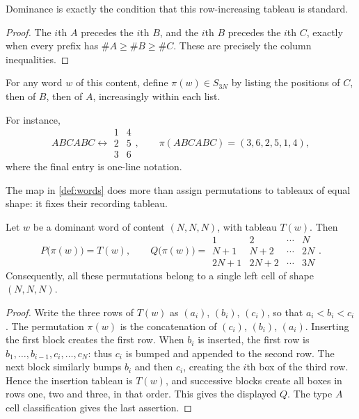 \documentclass[a4paper,11pt]{amsart}
\numberwithin{equation}{subsection}
\theoremstyle{plain}
\theoremstyle{definition}
\theoremstyle{remark}
\begin{document}
\begin{lemma}
Dominance is exactly the condition
that this row-increasing tableau is standard.
\end{lemma}

\begin{proof}
The $i$th $A$ precedes the $i$th $B$, and the $i$th $B$
precedes the $i$th $C$, exactly when every prefix has
$\#A\ge\#B\ge\#C$. These are precisely the column inequalities.
\end{proof}

\begin{definition}\label{def:words}
For any word $w$ of this content, define $\pi(w)\in S_{3N}$ by listing
the positions of $C$, then of $B$, then of $A$, increasingly within
each list. 
\end{definition}

\begin{example}
For instance,
\[
ABCABC\longleftrightarrow
\begin{array}{cc}1&4\\2&5\\3&6\end{array},
\qquad \pi(ABCABC)=(3,6,2,5,1,4),
\]
where the final entry is one-line notation.
\end{example}

The map in \autoref{def:words} does more than assign permutations
to tableaux of equal shape: it fixes their recording tableau.

\begin{lemma}\label{lem:rectangular-cell}
Let $w$ be a dominant word of content $(N,N,N)$, with tableau $T(w)$.
Then
\[
P\big(\pi(w)\big)=T(w),\qquad
Q\big(\pi(w)\big)=
\begin{array}{cccc}
1&2&\cdots&N\\
N+1&N+2&\cdots&2N\\
2N+1&2N+2&\cdots&3N
\end{array}.
\]
Consequently, all these permutations belong to a single left cell
of shape $(N,N,N)$.
\end{lemma}

\begin{proof}
Write the three rows of $T(w)$ as $(a_i)$, $(b_i)$, $(c_i)$, so that
$a_i<b_i<c_i$. The permutation $\pi(w)$ is the concatenation of
$(c_i)$, $(b_i)$, $(a_i)$. Inserting the first block creates the first
row. When $b_i$ is inserted, the first row is
$b_1,\ldots,b_{i-1},c_i,\ldots,c_N$: thus $c_i$ is bumped and appended
to the second row. The next block similarly bumps $b_i$ and then
$c_i$, creating the $i$th box of the third row. Hence the insertion
tableau is $T(w)$, and successive blocks create all boxes in rows
one, two and three, in that order. This gives the displayed $Q$.
The type $A$ cell classification gives the last assertion.
\end{proof}
\end{document}
